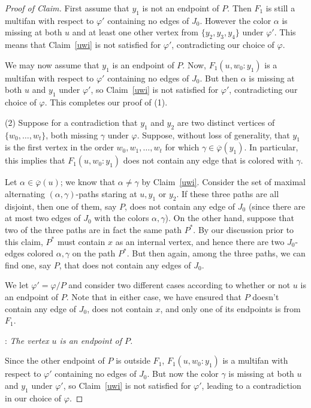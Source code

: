 \documentclass[10pt,a4paper]{amsart}
\newcommand{\pbar}{\overline{\varphi}}
\newenvironment{proofc}{\begin{proof}[Proof of Claim]}{\end{proof}}
\begin{document}
\begin{proofc}
First assume that $y_1$ is not an endpoint of $P$. Then $F_1$ is still a multifan with respect to $\varphi'$ containing no edges of $J_0$. However the color  $\alpha$ is missing at both $u$ and at least one other vertex from $\{y_2, y_3, y_4\}$ under $\varphi'$. This means that Claim~\ref{uwi} is not satisfied for $\varphi'$, contradicting our choice of $\varphi$.

We may now assume that $y_1$ is an endpoint of $P$. Now, $F_1(u, w_0:y_1)$ is a multifan with respect to $\varphi'$ containing no edges of $J_0$. But then $\alpha$ is missing at both $u$ and $y_1$ under $\varphi'$, so Claim~\ref{uwi} is not satisfied for $\varphi'$, contradicting our choice of $\varphi$.  This completes our proof of (1).

\noindent (2) Suppose for a contradiction that $y_1$ and $y_2$ are two distinct vertices of $\{w_0, \ldots, w_t\}$, both missing $\gamma$ under $\varphi$. Suppose, without loss of generality, that $y_1$ is the first vertex 
in the order $w_0, w_1, \ldots, w_t$ for which $\gamma\in \pbar(y_1)$. In particular, this implies that $F_1(u, w_0:y_1)$ does not contain any edge that is colored with $\gamma$.  

Let $\alpha\in \pbar(u)$; we know that $\alpha\ne \gamma$ by Claim~\ref{uwi}. Consider the set of  maximal alternating $(\alpha, \gamma)$-paths staring at $u, y_1$ or $y_2$. If these three paths are all disjoint, 
then one of them, say $P$,  does not contain any edge of $J_0$ (since there are at most two edges of $J_0$ with the colors $\alpha, \gamma$). On the other hand, suppose that two of the three paths are in fact the same path $P^*$. By our discussion prior to this claim, $P^*$ must contain $x$ as an internal vertex, and hence there are two $J_0$-edges colored $\alpha, \gamma$ on the path $P^*$. But then again, among the three paths, we can find one, say $P$, that does not contain any edges of $J_0$.

We let $\varphi'=\varphi/P$ and consider two different cases according to whether or not $u$ is an endpoint of $P$. Note that in either case, we have ensured that $P$ doesn't contain any edge of $J_0$, does not contain $x$, and only one of its endpoints is from $F_1$.


:  \emph{The vertex $u$ is an endpoint of $P$.}

Since the other endpoint of $P$ is outside $F_1$, $F_1(u, w_0:y_1)$ is a multifan with respect to $\varphi'$ containing no edges of $J_0$. But now the color $\gamma$ is missing at both $u$ and $y_1$ under $\varphi'$, so Claim~\ref{uwi} is not satisfied for $\varphi'$, leading to a contradiction in our choice of $\varphi$.


\end{proofc}
\end{document}
